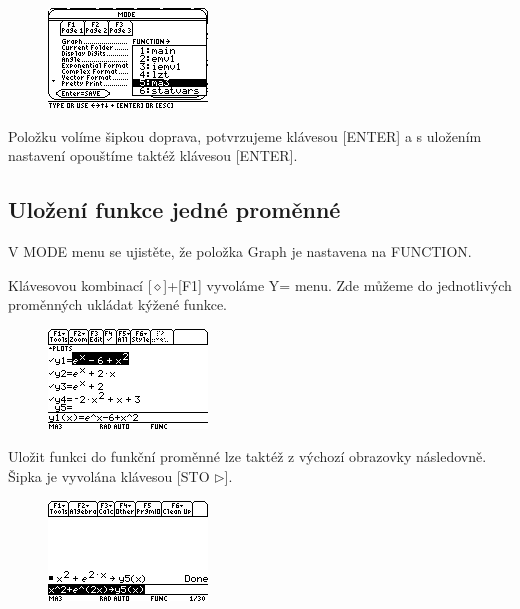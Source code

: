 \documentclass[10pt,a4paper,float]{article}
\begin{document}
\begin{figure}[H]
	\centering
	\includegraphics[width=.5\textwidth]{img/CHANGEFOLDER}
\end{figure}

Položku volíme šipkou doprava, potvrzujeme klávesou [ENTER] a s uložením nastavení opouštíme taktéž klávesou [ENTER].

\pagebreak

\subsection{Uložení funkce jedné proměnné}
V MODE menu se ujistěte, že položka Graph je nastavena na FUNCTION.

Klávesovou kombinací [$\diamond$]+[F1] vyvoláme Y= menu. Zde můžeme do jednotlivých proměnných ukládat kýžené funkce.

\begin{figure}[H]
	\centering
	\includegraphics[width=.5\textwidth]{img/1FUNC}
\end{figure}

Uložit funkci do funkční proměnné lze taktéž z výchozí obrazovky následovně. Šipka je vyvolána klávesou [STO $\triangleright$].

\begin{figure}[H]
	\centering
	\includegraphics[width=.5\textwidth]{img/1FUNC_ULOZ}
\end{figure}
\end{document}
